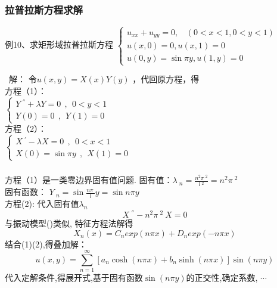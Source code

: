 \begin{frame}
	\frametitle{拉普拉斯方程求解}
	\begin{exampleblock} {例10、求矩形域拉普拉斯方程}
        $\displaystyle \begin{cases}
            u_{xx} +u_{yy} =0 ,~~~~ (0<x<1, 0<y<1)\\
            u(x,0)= 0,  u(x,1)= 0 \\
            u(0,y)=\sin \pi y,  u(1,y)= 0
        \end{cases}$ \\
    \end{exampleblock}
        \alert{ 解：}	令$ u(x,y)=X(x) Y(y)$ ，代回原方程，得 \\
        方程（1）：\\
        $\displaystyle  \begin{cases}
            Y~^{''} +\lambda Y=0  ~~,~~ 0<y<1\\
            Y(0)=0 ~~,~~Y(1)=0 
        \end{cases}$ \\	
        方程（2）：\\
        $\displaystyle  \begin{cases}
            X~^{'} -\lambda X=0  ~~,~~ 0<x<1 \\
            X(0)=\sin \pi y~~,~~X(1)=0 
        \end{cases}$ \\	\vspace{0.3em}

\end{frame}	

\begin{frame}
      \frametitle{}
        方程（1）是一类零边界固有值问题.  
        固有值：$\displaystyle  \lambda~_n=\frac{n^2\pi~^2}{l~^2} =n^2\pi~^2$ \\ 
        固有函数： $\displaystyle  Y~_n= \sin \frac{n\pi~}{l} y = \sin n \pi y $ \\	
        方程(2): 代入固有值$\lambda_n$  \[ \displaystyle  X~^{''} - n^2\pi~^2~X=0 \]
        与振动模型({\color{red}{[例3]}})类似, 特征方程法解得
        \begin{equation*}
            X_n(x)=C_n exp(n\pi x )+ D_n exp(-n\pi x )
        \end{equation*}	
        结合(1)(2),得叠加解：
        \begin{equation*}
            u(x, y)   = \sum\limits_{n=1}^{\infty }  [a_n \cosh (n\pi x )+ b_n \sinh (n\pi x ) ] \sin (n \pi y)  
        \end{equation*}	
        {\color{red}{[X]}} 代入定解条件,得展开式,基于固有函数$\sin (n \pi y) $的正交性,确定系数, $\cdots $ \\ 
\end{frame}

